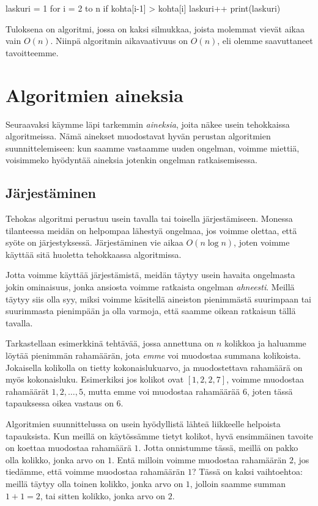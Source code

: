 \begin{code}
laskuri = 1
for i = 2 to n
    if kohta[i-1] > kohta[i]
        laskuri++
print(laskuri)
\end{code}

Tuloksena on algoritmi, jossa on kaksi silmukkaa,
joista molemmat vievät aikaa vain $O(n)$.
Niinpä algoritmin aikavaativuus on $O(n)$,
eli olemme saavuttaneet tavoitteemme.

\section{Algoritmien aineksia}

Seuraavaksi käymme läpi tarkemmin \emph{aineksia},
joita näkee usein tehokkaissa algoritmeissa.
Nämä ainekset muodostavat hyvän perustan algoritmien
suunnittelemiseen: kun saamme vastaamme uuden ongelman,
voimme miettiä, voisimmeko hyödyntää aineksia jotenkin
ongelman ratkaisemisessa.

\subsection{Järjestäminen}

Tehokas algoritmi perustuu usein tavalla tai toisella järjestämiseen.
Monessa tilanteessa meidän on helpompaa lähestyä ongelmaa,
jos voimme olettaa, että syöte on järjestyksessä.
Järjestäminen vie aikaa $O(n \log n)$, joten voimme käyttää sitä
huoletta tehokkaassa algoritmissa.

Jotta voimme käyttää järjestämistä, meidän täytyy usein havaita
ongelmasta jokin ominaisuus, jonka ansiosta voimme ratkaista
ongelman \emph{ahneesti}.
Meillä täytyy siis olla syy, miksi voimme käsitellä aineiston
pienimmästä suurimpaan tai suurimmasta pienimpään ja
olla varmoja,
että saamme oikean ratkaisun tällä tavalla.

Tarkastellaan esimerkkinä tehtävää, jossa annettuna on
$n$ kolikkoa ja haluamme löytää pienimmän rahamäärän,
jota \emph{emme} voi muodostaa summana kolikoista.
Jokaisella kolikolla on tietty kokonaislukuarvo, ja
muodostettava rahamäärä on myös kokonaisluku.
Esimerkiksi jos kolikot ovat $[1,2,2,7]$,
voimme muodostaa rahamäärät $1,2,\dots,5$,
mutta emme voi muodostaa rahamäärää $6$,
joten tässä tapauksessa oikea vastaus on $6$.

Algoritmien suunnittelussa on usein hyödyllistä
lähteä liikkeelle helpoista tapauksista.
Kun meillä on käytössämme tietyt kolikot,
hyvä ensimmäinen tavoite on koettaa muodostaa rahamäärä $1$.
Jotta onnistumme tässä, meillä on pakko olla kolikko,
jonka arvo on $1$.
Entä milloin voimme muodostaa rahamäärän $2$,
jos tiedämme, että voimme muodostaa rahamäärän $1$?
Tässä on kaksi vaihtoehtoa: meillä täytyy olla
toinen kolikko, jonka arvo on $1$, jolloin saamme
summan $1+1=2$, tai sitten kolikko, jonka arvo on $2$.

